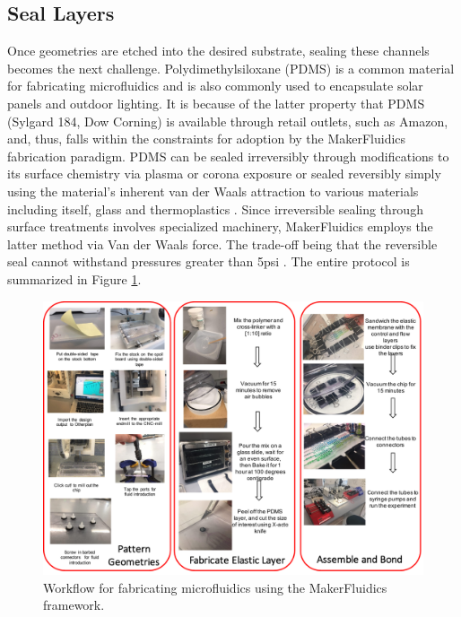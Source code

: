 \subsection{Seal Layers}
Once geometries are etched into the desired substrate, sealing these channels becomes the next challenge. Polydimethylsiloxane (PDMS) is a common material for fabricating microfluidics \cite{mcdonald2002poly} and is also commonly used to encapsulate solar panels and outdoor lighting. It is because of the latter property that PDMS (Sylgard 184, Dow Corning) is available through retail outlets, such as Amazon, and, thus, falls within the constraints for adoption by the MakerFluidics fabrication paradigm. PDMS can be sealed irreversibly through modifications to its surface chemistry via plasma or corona exposure or sealed reversibly simply using the material's inherent van der Waals attraction to various materials including itself, glass and thermoplastics \cite{mcdonald2002poly}. Since irreversible sealing through surface treatments involves specialized machinery, MakerFluidics employs the latter method via Van der Waals force. The trade-off being that the reversible seal cannot withstand pressures greater than 5psi \cite{mcdonald2002poly}. The entire protocol is summarized in Figure \ref{fig:fabFlow}.


\begin{figure}[h]
  \begin{minipage}[t]{0.99\linewidth}\centering
    \includegraphics[width=14cm]{fabFlow.pdf}
    \medskip
  \end{minipage}\hfill
  \caption[The MakerFluidics fabrication protocol]{Workflow for fabricating microfluidics using the MakerFluidics framework.}
    \label{fig:fabFlow}
\end{figure}




